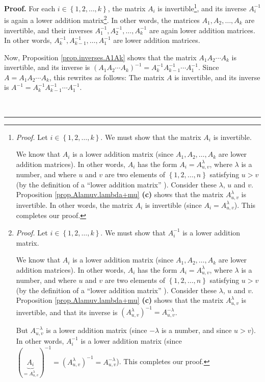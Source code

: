 \documentclass[numbers=enddot,12pt,final,onecolumn,notitlepage]{scrartcl}%
\theoremstyle{definition}
\newenvironment{proof}[1][Proof]{\noindent\textbf{#1.} }{\ \rule{0.5em}{0.5em}}
\begin{document}
\begin{proof}
For each $i\in\left\{  1,2,\ldots,k\right\}  $, the matrix $A_{i}$ is
invertible\footnote{\textit{Proof.} Let $i\in\left\{  1,2,\ldots,k\right\}  $.
We must show that the matrix $A_{i}$ is invertible.
\par
We know that $A_{i}$ is a lower addition matrix (since $A_{1},A_{2}%
,\ldots,A_{k}$ are lower addition matrices). In other words, $A_{i}$ has the
form $A_{i}=A_{u,v}^{\lambda}$, where $\lambda$ is a number, and where $u$ and
$v$ are two elements of $\left\{  1,2,\ldots,n\right\}  $ satisfying $u>v$ (by
the definition of a \textquotedblleft lower addition matrix\textquotedblright%
). Consider these $\lambda$, $u$ and $v$. Proposition
\ref{prop.Alamuv.lambda+mu} \textbf{(c)} shows that the matrix $A_{u,v}%
^{\lambda}$ is invertible. In other words, the matrix $A_{i}$ is invertible
(since $A_{i}=A_{u,v}^{\lambda}$). This completes our proof.}, and its inverse
$A_{i}^{-1}$ is again a lower addition matrix\footnote{\textit{Proof.} Let
$i\in\left\{  1,2,\ldots,k\right\}  $. We must show that $A_{i}^{-1}$ is a
lower addition matrix.
\par
We know that $A_{i}$ is a lower addition matrix (since $A_{1},A_{2}%
,\ldots,A_{k}$ are lower addition matrices). In other words, $A_{i}$ has the
form $A_{i}=A_{u,v}^{\lambda}$, where $\lambda$ is a number, and where $u$ and
$v$ are two elements of $\left\{  1,2,\ldots,n\right\}  $ satisfying $u>v$ (by
the definition of a \textquotedblleft lower addition matrix\textquotedblright%
). Consider these $\lambda$, $u$ and $v$. Proposition
\ref{prop.Alamuv.lambda+mu} \textbf{(c)} shows that the matrix $A_{u,v}%
^{\lambda}$ is invertible, and that its inverse is $\left(  A_{u,v}^{\lambda
}\right)  ^{-1}=A_{u,v}^{-\lambda}$.
\par
But $A_{u,v}^{-\lambda}$ is a lower addition matrix (since $-\lambda$ is a
number, and since $u>v$). In other words, $A_{i}^{-1}$ is a lower addition
matrix (since $\left(  \underbrace{A_{i}}_{=A_{u,v}^{\lambda}}\right)
^{-1}=\left(  A_{u,v}^{\lambda}\right)  ^{-1}=A_{u,v}^{-\lambda}$). This
completes our proof.}. In other words, the matrices $A_{1},A_{2},\ldots,A_{k}$
are invertible, and their inverses $A_{1}^{-1},A_{2}^{-1},\ldots,A_{k}^{-1}$
are again lower addition matrices. In other words, $A_{k}^{-1},A_{k-1}%
^{-1},\ldots,A_{1}^{-1}$ are lower addition matrices.

Now, Proposition \ref{prop.inverses.A1Ak} shows that the matrix $A_{1}%
A_{2}\cdots A_{k}$ is invertible, and its inverse is $\left(  A_{1}A_{2}\cdots
A_{k}\right)  ^{-1}=A_{k}^{-1}A_{k-1}^{-1}\cdots A_{1}^{-1}$. Since
$A=A_{1}A_{2}\cdots A_{k}$, this rewrites as follows: The matrix $A$ is
invertible, and its inverse is $A^{-1}=A_{k}^{-1}A_{k-1}^{-1}\cdots A_{1}%
^{-1}$.


\end{proof}
\end{document}
